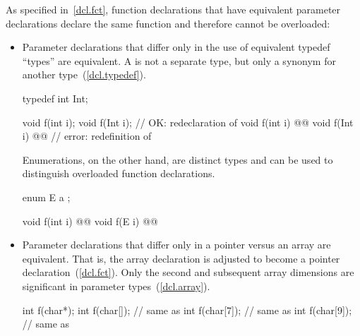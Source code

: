\pnum
{}%
%
\begin{note}
As specified in~\ref{dcl.fct},
function declarations that have equivalent parameter declarations declare
the same function and therefore cannot
be overloaded:

\begin{itemize}
\item
{}%
Parameter declarations that differ only in the use of equivalent typedef
``types'' are equivalent.
A
is not a separate type, but only a synonym for another type~(\ref{dcl.typedef}).
\begin{example}

\begin{codeblock}
typedef int Int;

void f(int i);
void f(Int i);                  // OK: redeclaration of 
void f(int i) @@
void f(Int i) @@    // error: redefinition of 

\end{codeblock}
\end{example}

%
Enumerations, on the other hand, are distinct types and can be used to
distinguish
overloaded function declarations.
\begin{example}

\begin{codeblock}
enum E { a };

void f(int i) @@
void f(E i)   @@
\end{codeblock}
\end{example}

\item
{}%
%
Parameter declarations that differ only in a pointer
\tcode{*}
versus an array
\tcode{[]}
are equivalent.
That is, the array declaration is adjusted to become a pointer
declaration~(\ref{dcl.fct}).
Only the second and subsequent array dimensions are significant in
parameter types~(\ref{dcl.array}).
\begin{example}

\begin{codeblock}
int f(char*);
int f(char[]);                  // same as 
int f(char[7]);                 // same as 
int f(char[9]);                 // same as 


\end{codeblock}
\end{example}
\end{itemize}
\end{note}
